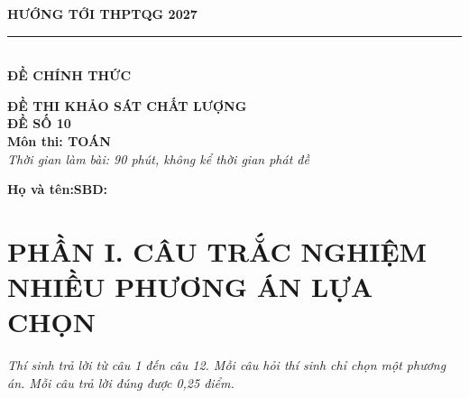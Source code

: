 \documentclass[12pt,a4paper]{article}
\begin{document}
\noindent
\begin{minipage}[t]{0.40\textwidth}
    \centering
    \textbf{HƯỚNG TỚI THPTQG 2027}\\[-2pt]
    \rule{3.2cm}{0.6pt}\\[4pt]
    \textbf{ĐỀ CHÍNH THỨC}
\end{minipage}\hfill
\begin{minipage}[t]{0.58\textwidth}
    \centering
    \textbf{ĐỀ THI KHẢO SÁT CHẤT LƯỢNG}\\
    \textbf{ĐỀ SỐ 10}\\
    \textbf{Môn thi: TOÁN}\\
    \textit{\small Thời gian làm bài: 90 phút, không kể thời gian phát đề}
\end{minipage}

\vspace{0.2cm}
\noindent
\begin{minipage}[b]{0.78\textwidth}
    \textbf{Họ và tên:}\dotfill\textbf{SBD:}\makebox[3.5cm]{\dotfill}
\end{minipage}\hfill
\begin{minipage}[b]{0.20\textwidth}
    \hfill
    \setlength{\fboxrule}{0.8pt}%
\end{minipage}
\vspace{0.2cm}

\section*{\large PHẦN I. CÂU TRẮC NGHIỆM NHIỀU PHƯƠNG ÁN LỰA CHỌN}
\textit{Thí sinh trả lời từ câu 1 đến câu 12. Mỗi câu hỏi thí sinh chỉ chọn một phương án. Mỗi câu trả lời đúng được 0,25 điểm.}
\end{document}
